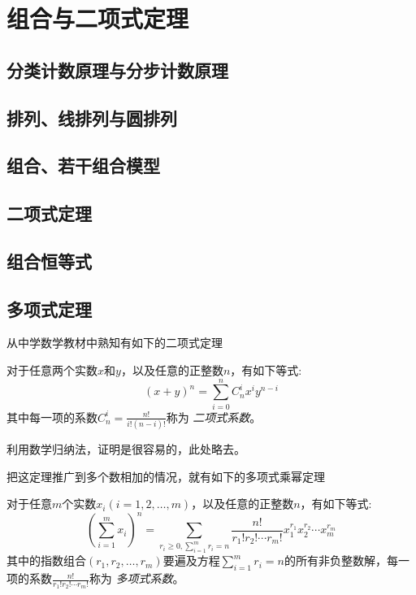 
\section{组合与二项式定理}
\label{sec:polynomial-power-theorem}

\subsection{分类计数原理与分步计数原理}
\label{sec:principle-of-count-by-categries-or-step}

\subsection{排列、线排列与圆排列}
\label{sec:arrangement-to-line-or-circle}

\subsection{组合、若干组合模型}
\label{sec:combine-and-its-equation}

\subsection{二项式定理}
\label{sec:binomial-theorem}

\subsection{组合恒等式}
\label{sec:combine-identical-equation}

\subsection{多项式定理}
\label{sec:polynomial-theorem}

从中学数学教材中熟知有如下的二项式定理
\begin{theorem}[二项式定理]
  对于任意两个实数$x$和$y$，以及任意的正整数$n$，有如下等式:
  \begin{equation}
    \label{eq:binomial-theorem}
    (x+y)^n = \sum_{i=0}^n C_n^i x^iy^{n-i}
  \end{equation}
  其中每一项的系数$C_n^i=\frac{n!}{i!(n-i)!}$称为 \emph{二项式系数}。
\end{theorem}

利用数学归纳法，证明是很容易的，此处略去。

把这定理推广到多个数相加的情况，就有如下的多项式乘幂定理
\begin{theorem}[多项式乘幂定理]
  对于任意$m$个实数$x_i(i=1,2,\ldots,m)$，以及任意的正整数$n$，有如下等式:
  \begin{equation}
    \label{eq:polynomial-theorem}
    \left( \sum_{i=1}^m x_i \right)^n = \sum_{r_{i} \geqslant 0,\sum_{i=1}^{m}r_{i}=n} \frac{n!}{r_1!r_2!\cdots r_m!}x_1^{r_1}x_2^{r_2}\cdots x_m^{r_m}
  \end{equation}
  其中的指数组合$(r_1,r_2,\ldots,r_{m})$要遍及方程$\sum_{i=1}^{m}r_{i}=n$的所有非负整数解，每一项的系数$\frac{n!}{r_1!r_{2}!\cdots r_{m}!}$称为 \emph{多项式系数}。
\end{theorem}


